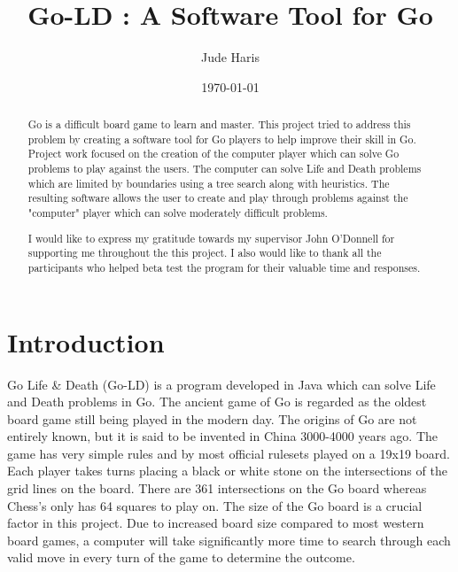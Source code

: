 \documentclass{l4proj}
\begin{document}
\title{Go-LD : A Software Tool for Go}
\author{Jude Haris}
\date{\today}


\maketitle

\begin{abstract}
    Go is a difficult board game to learn and master. This project tried to address this problem by creating a software tool for Go players to help improve their skill in Go. Project work  focused on the creation of the computer player which can solve Go problems to play against the users. The computer can solve Life and Death problems which are limited by boundaries using a tree search along with heuristics. The resulting software allows the user to create and play through problems against the "computer" player which can solve moderately difficult problems.
\end{abstract}

\renewcommand{\abstractname}{Acknowledgements}
\begin{abstract}
I would like to express my gratitude towards my supervisor John O'Donnell for supporting me throughout the this project. I also would like to thank all the participants who helped beta test the program for their valuable time and responses.
\end{abstract}



\def\consentname {Jude Christudas Haris}
\def\consentdate {\today}

\educationalconsent


\tableofcontents



\chapter{Introduction}

Go Life \& Death (Go-LD) is a program developed in Java which can solve Life and Death problems in Go. The ancient game of Go is regarded as the oldest board game still being played in the modern day. The origins of Go are not entirely known, but it is said to be invented in China 3000-4000 years ago. The game has very simple rules and by most official rulesets played on a 19x19 board. Each player takes turns placing a black or white stone on the intersections of the grid lines on the board. There are 361 intersections on the Go board whereas Chess’s only has 64 squares to play on. The size of the Go board is a crucial factor in this project. Due to increased board size compared to most western board games, a computer will take significantly more time to search through each valid move in every turn of the game to determine the outcome.
\end{document}
